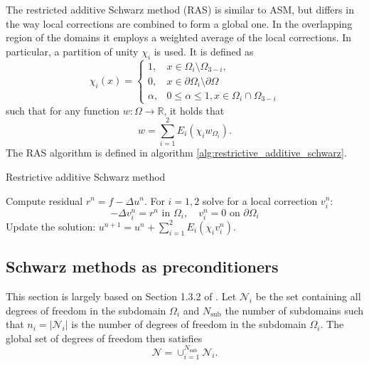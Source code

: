 The restricted additive Schwarz method (RAS) is similar to ASM, but differs in the way local corrections are combined to form a global one. In the overlapping region of the domains it employs a weighted average of the local corrections. In particular, a partition of unity $\chi_i$ is used. It is defined as
\[
  \chi_i(x)=
  \begin{cases}
    1,      & x \in \Omega_i \setminus \Omega_{3-i},                 \\
    0,      & x \in \partial \Omega_i \setminus \partial \Omega      \\
    \alpha, & 0 \leq \alpha \leq 1, x \in \Omega_i \cap \Omega_{3-i}
  \end{cases}
\]
such that for any function $w: \Omega \rightarrow \mathbb{R}$, it holds that
\[
  w = \sum_{i=1}^{2}E_i(\chi_i w_{\Omega_i}).
\]
The RAS algorithm is defined in algorithm \ref{alg:restrictive_additive_schwarz}.
\begin{algorithm}[H]
  \caption{Restrictive additive Schwarz method \cite[Algorithm 1.1]{schwarz_methods_Dolean_2015}}
  \label{alg:restrictive_additive_schwarz}
  \begin{algorithmic}
    \State Compute residual $r^n=f-\Delta u^n$.
    \State For $i=1,2$ solve for a local correction $v_i^n$:
    \[
      -\Delta v_i^n=r^n \text{ in } \Omega_i, \quad v_i^n=0 \text{ on } \partial \Omega_i
    \]
    \State Update the solution: $u^{n+1}=u^n + \sum_{i=1}^{2}E_i(\chi_i v_i^n)$.
  \end{algorithmic}
\end{algorithm}

\subsection{Schwarz methods as preconditioners}\label{sec:schwarz_preconditioners}
This section is largely based on Section 1.3.2 of \cite{schwarz_methods_Dolean_2015}. Let  $\mathcal{N}_i$ be the set containing all degrees of freedom in the subdomain $\Omega_i$ and $N_{\text{sub}}$ the number of subdomains such that $n_i = |\mathcal{N}_i|$ is the number of degrees of freedom in the subdomain $\Omega_i$. The global set of degrees of freedom then satisfies
\[
  \mathcal{N}=\cup_{i=1}^{N_{\text{sub}}} \mathcal{N}_i.
\]

